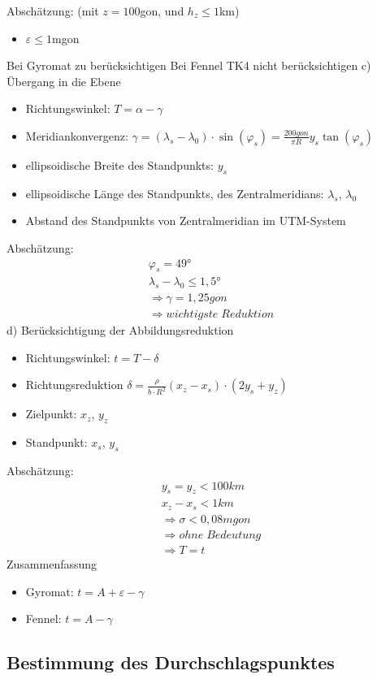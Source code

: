 \documentclass[12pt]{article}
\begin{document}
Abschätzung: (mit $z=100$gon, und $h_z \leq 1$km)
\begin{itemize}
	\item $\varepsilon \leq 1$mgon
\end{itemize}
Bei Gyromat zu berücksichtigen \newline
Bei Fennel TK4 nicht berücksichtigen \newline
\newline
c) Übergang in die Ebene
\begin{itemize}
	\item Richtungswinkel: $T = \alpha - \gamma$
	\item Meridiankonvergenz: $\gamma = (\lambda_s - \lambda_0) \cdot \sin(\varphi_s) = \frac{200gon}{\pi R} y_s \tan(\varphi_s)$
	\item ellipsoidische Breite des Standpunkts: $y_s$
	\item ellipsoidische Länge des Standpunkts, des Zentralmeridians: $\lambda_s$, $\lambda_0$
	\item Abstand des Standpunkts von Zentralmeridian im UTM-System
\end{itemize}
Abschätzung:
\begin{gather*}
	\varphi_s = 49° \\
	\lambda_s - \lambda_0 \leq 1,5° \\
	\Rightarrow \gamma = 1,25gon \\
	\Rightarrow wichtigste\; Reduktion
\end{gather*}
d) Berücksichtigung der Abbildungsreduktion
\begin{itemize}
	\item Richtungswinkel: $t = T - \delta$
	\item Richtungsreduktion $\delta = \frac{\rho}{b \cdot R^2} (x_z - x_s) \cdot (2y_s + y_z)$
	\item Zielpunkt: $x_z$, $y_z$
	\item Standpunkt: $x_s$, $y_s$
\end{itemize}
Abschätzung:
\begin{gather*}
	y_s = y_z < 100km \\
	x_z - x_s < 1km \\
	\Rightarrow \sigma < 0,08mgon \\
	\Rightarrow ohne\; Bedeutung \\
	\Rightarrow T = t
\end{gather*}
Zusammenfassung
\begin{itemize}
	\item Gyromat: $t = A + \varepsilon - \gamma$
	\item Fennel: $t = A - \gamma$
\end{itemize}
\subsection{Bestimmung des Durchschlagspunktes}
\end{document}

